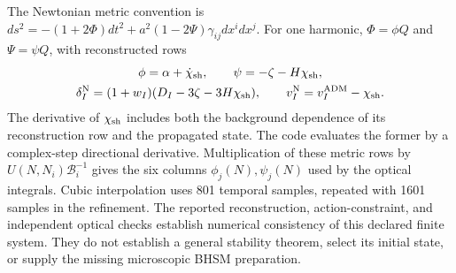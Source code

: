 The Newtonian metric convention is
$ds^2=-(1+2\Phi)dt^2+a^2(1-2\Psi)\gamma_{ij}dx^idx^j$.
For one harmonic, $\Phi=\phi Q$ and $\Psi=\psi Q$, with reconstructed rows
\begin{equation}
 \begin{gathered}
 \phi=\alpha+\dot\chi_{\rm sh},\qquad
 \psi=-\zeta-H\chi_{\rm sh},\\
 \delta_I^{\rm N}=(1+w_I)(D_I-3\zeta-3H\chi_{\rm sh}),\qquad
 v_I^{\rm N}=v_I^{\rm ADM}-\chi_{\rm sh} .
 \end{gathered}
 \label{eq:app-newtonian-map}
\end{equation}
The derivative of $\chi_{\rm sh}$ includes both the background dependence
of its reconstruction row and the propagated state.  The code evaluates
the former by a complex-step directional derivative.  Multiplication of
these metric rows by $U(N,N_i)\mathcal B_i^{-1}$ gives the six columns
$\phi_j(N),\psi_j(N)$ used by the optical integrals.  Cubic interpolation
uses 801 temporal samples, repeated with 1601 samples in the refinement.
The reported reconstruction, action-constraint, and independent optical
checks establish numerical consistency of this declared finite system.
They do not establish a general stability theorem, select its initial
state, or supply the missing microscopic BHSM preparation.
